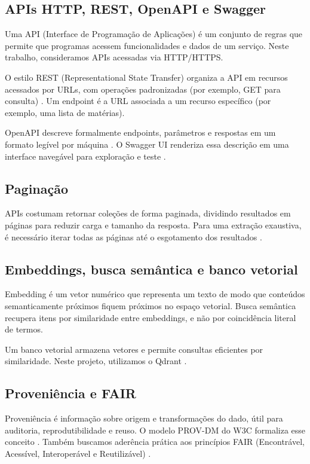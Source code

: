 \documentclass[10pt,a4paper]{article}
\begin{document}
\subsection{APIs HTTP, REST, OpenAPI e Swagger}

Uma API (Interface de Programação de Aplicações) é um conjunto de regras que permite que programas acessem funcionalidades e dados de um serviço. Neste trabalho, consideramos APIs acessadas via HTTP/HTTPS.

O estilo REST (Representational State Transfer) organiza a API em recursos acessados por URLs, com operações padronizadas (por exemplo, GET para consulta) \cite{fielding_rest_2000}. Um endpoint é a URL associada a um recurso específico (por exemplo, uma lista de matérias).

OpenAPI descreve formalmente endpoints, parâmetros e respostas em um formato legível por máquina \cite{openapi_3_2}. O Swagger UI renderiza essa descrição em uma interface navegável para exploração e teste \cite{swagger_ui}.

\subsection{Paginação}

APIs costumam retornar coleções de forma paginada, dividindo resultados em páginas para reduzir carga e tamanho da resposta. Para uma extração exaustiva, é necessário iterar todas as páginas até o esgotamento dos resultados \cite{drf_pagination}.

\subsection{Embeddings, busca semântica e banco vetorial}

Embedding é um vetor numérico que representa um texto de modo que conteúdos semanticamente próximos fiquem próximos no espaço vetorial. Busca semântica recupera itens por similaridade entre embeddings, e não por coincidência literal de termos.

Um banco vetorial armazena vetores e permite consultas eficientes por similaridade. Neste projeto, utilizamos o Qdrant \cite{qdrant_overview,qdrant_collections}.

\subsection{Proveniência e FAIR}

Proveniência é informação sobre origem e transformações do dado, útil para auditoria, reprodutibilidade e reuso. O modelo PROV-DM do W3C formaliza esse conceito \cite{w3c_prov_dm}. Também buscamos aderência prática aos princípios FAIR (Encontrável, Acessível, Interoperável e Reutilizável) \cite{wilkinson_fair_2016}.
\end{document}
